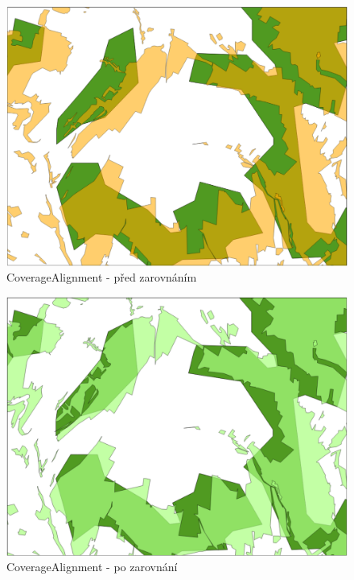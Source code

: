   \begin{figure}[H]
    \centering
      \includegraphics[width=360pt]{./pictures/test-ca2.pdf}
      \caption{CoverageAlignment - před zarovnáním}
      \label{fig:ca2}
  \end{figure}

  \begin{figure}[H]
    \centering
      \includegraphics[width=360pt]{./pictures/test-ca3.pdf}
      \caption{CoverageAlignment - po zarovnání}
      \label{fig:ca3}
  \end{figure}

